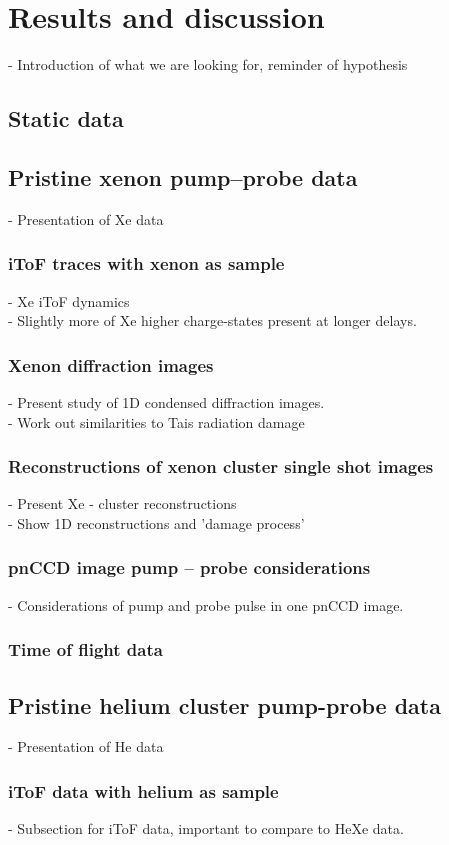 \chapter{Results and discussion}\label{ch:results}
- Introduction of what we are looking for, reminder of hypothesis
\section{Static data}
\section{Pristine xenon pump--probe data}
- Presentation of Xe data
\subsection{iToF traces with xenon as sample}
- Xe iToF dynamics\\
- Slightly more of Xe higher charge-states present at longer delays.
\subsection{Xenon diffraction images}
- Present study of 1D condensed diffraction images.\\
- Work out similarities to Tais radiation damage
\subsection{Reconstructions of xenon cluster single shot images}
- Present Xe - cluster reconstructions\\
- Show 1D reconstructions and 'damage process'
\subsection{pnCCD image pump -- probe considerations}
- Considerations of pump and probe pulse in one pnCCD image.
\subsection{Time of flight data}
\section{Pristine helium cluster pump-probe data}
- Presentation of He data
\subsection{iToF data with helium as sample}
- Subsection for iToF data, important to compare to HeXe data.
